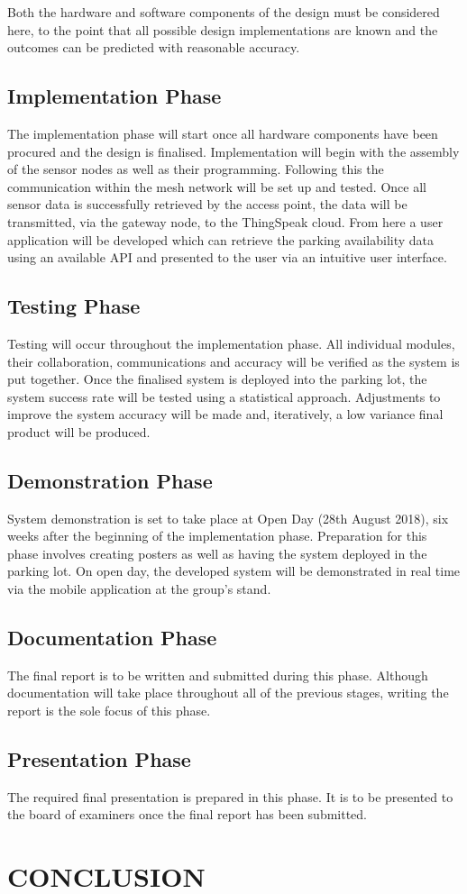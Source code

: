 \documentclass[10pt,twocolumn]{witseiepaper}
\begin{document}
		Both the hardware and software components of the design must be considered here, to the point that all possible design implementations are known and the outcomes can be predicted with reasonable accuracy. 
	
	\subsection{Implementation Phase}
		The implementation phase will start once all hardware components have been procured and the design is finalised. Implementation will begin with the assembly of the sensor nodes as well as their programming. Following this the communication within the mesh network will be set up and tested. Once all sensor data is successfully retrieved by the access point, the data will be transmitted, via the gateway node, to the ThingSpeak cloud. From here a user application will be developed which can retrieve the parking availability data using an available API and presented to the user via an intuitive user interface.
	
	\subsection{Testing Phase}
		Testing will occur throughout the implementation phase. All individual modules, their collaboration, communications and accuracy will be verified as the system is put together. Once the finalised system is deployed into the parking lot, the system success rate will be tested using a statistical approach. Adjustments to improve the system accuracy will be made and, iteratively, a low variance final product will be produced.
		
	\subsection{Demonstration Phase}
		System demonstration is set to take place at Open Day (28th August 2018), six weeks after the beginning of the implementation phase. Preparation for this phase involves creating posters as well as having the system deployed in the parking lot. On open day, the developed system will be demonstrated in real time via the mobile application at the group's stand.
	
	\subsection{Documentation Phase}
		The final report is to be written and submitted during this phase. Although documentation will take place throughout all of the previous stages, writing the report is the sole focus of this phase.
	
	\subsection{Presentation Phase}
		The required final presentation is prepared in this phase. It is to be presented to the board of examiners once the final report has been submitted.
	

\section{CONCLUSION}

{}

\end{document}
